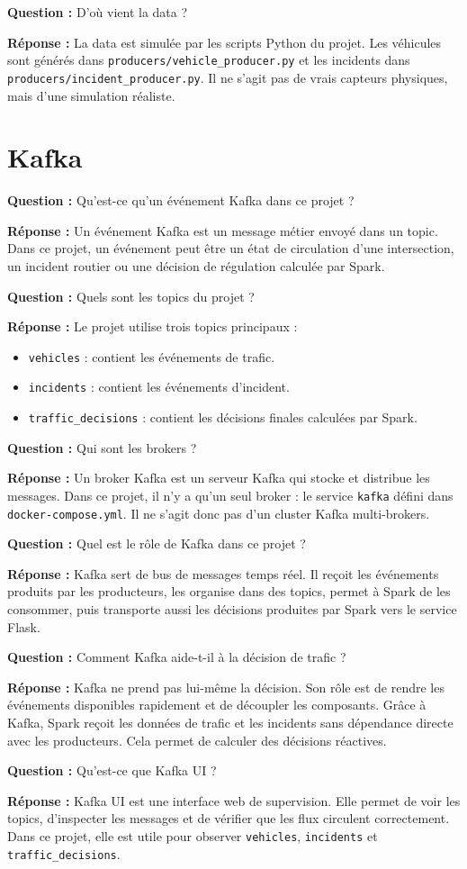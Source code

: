 \documentclass[11pt,a4paper]{article}
\newcommand{\question}[1]{
  \begin{questionbox}
  \textbf{Question :} #1
  \end{questionbox}
}
\newcommand{\reponse}{\textbf{Réponse : }}
\begin{document}
\question{D'où vient la data ?}
\reponse La data est simulée par les scripts Python du projet. Les véhicules sont générés dans \texttt{producers/vehicle\_producer.py} et les incidents dans \texttt{producers/incident\_producer.py}. Il ne s'agit pas de vrais capteurs physiques, mais d'une simulation réaliste.

\section{Kafka}

\question{Qu'est-ce qu'un événement Kafka dans ce projet ?}
\reponse Un événement Kafka est un message métier envoyé dans un topic. Dans ce projet, un événement peut être un état de circulation d'une intersection, un incident routier ou une décision de régulation calculée par Spark.

\question{Quels sont les topics du projet ?}
\reponse Le projet utilise trois topics principaux :
\begin{itemize}[leftmargin=1.4em]
  \item \texttt{vehicles} : contient les événements de trafic.
  \item \texttt{incidents} : contient les événements d'incident.
  \item \texttt{traffic\_decisions} : contient les décisions finales calculées par Spark.
\end{itemize}

\question{Qui sont les brokers ?}
\reponse Un broker Kafka est un serveur Kafka qui stocke et distribue les messages. Dans ce projet, il n'y a qu'un seul broker : le service \texttt{kafka} défini dans \texttt{docker-compose.yml}. Il ne s'agit donc pas d'un cluster Kafka multi-brokers.

\question{Quel est le rôle de Kafka dans ce projet ?}
\reponse Kafka sert de bus de messages temps réel. Il reçoit les événements produits par les producteurs, les organise dans des topics, permet à Spark de les consommer, puis transporte aussi les décisions produites par Spark vers le service Flask.

\question{Comment Kafka aide-t-il à la décision de trafic ?}
\reponse Kafka ne prend pas lui-même la décision. Son rôle est de rendre les événements disponibles rapidement et de découpler les composants. Grâce à Kafka, Spark reçoit les données de trafic et les incidents sans dépendance directe avec les producteurs. Cela permet de calculer des décisions réactives.

\question{Qu'est-ce que Kafka UI ?}
\reponse Kafka UI est une interface web de supervision. Elle permet de voir les topics, d'inspecter les messages et de vérifier que les flux circulent correctement. Dans ce projet, elle est utile pour observer \texttt{vehicles}, \texttt{incidents} et \texttt{traffic\_decisions}.
\end{document}
